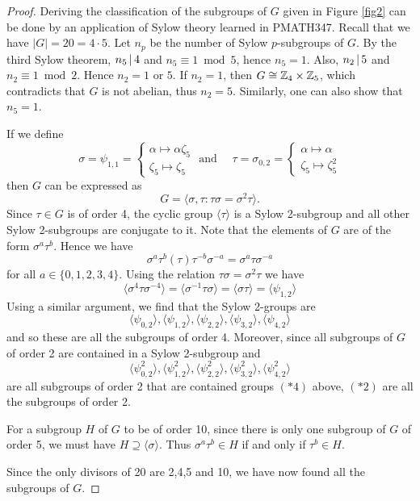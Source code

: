 \documentclass[11pt]{article}
\begin{document}
\begin{proof}
    Deriving the classification of the subgroups of $G$ given in Figure \ref{fig2} can be done by an application of Sylow theory learned in PMATH347. Recall that we have $|G|=20=4\cdot 5$. Let $n_p$ be the number of Sylow $p$-subgroups of $G$. By the third Sylow theorem, $n_5\,|\, 4$ and $n_5\equiv1\bmod{5}$, hence $n_5=1$. Also, $n_2\,|\, 5$ and $n_2\equiv1\bmod{2}$. Hence $n_2=1$ or $5$. If $n_2=1$, then $G\cong\mathbb{Z}_4\times\mathbb{Z}_5$, which contradicts that $G$ is not abelian, thus $n_2=5$. Similarly, one can also show that $n_5=1$. 

     If we define
    \[\sigma=\psi_{1,1}=\begin{cases}\alpha\mapsto\alpha\zeta_5 \\ \zeta_5\mapsto\zeta_5\end{cases}\text{ and }\quad\tau=\sigma_{0,2}=\begin{cases}\alpha\mapsto\alpha \\ \zeta_5\mapsto\zeta_5^2\end{cases}\]
    then $G$ can be expressed as
    \[G=\langle\sigma,\tau:\tau\sigma=\sigma^2\tau\rangle.\]
    Since $\tau\in G$ is of order 4, the cyclic group $\langle\tau\rangle$ is a Sylow 2-subgroup and all other Sylow 2-subgroups are conjugate to it. Note that the elements of $G$ are of the form $\sigma^a\tau^b$. Hence we have
    \[\sigma^a\tau^b(\tau)\tau^{-b}\sigma^{-a}=\sigma^a\tau\sigma^{-a}\]
    for all $a\in\{0,1,2,3,4\}$.
    Using the relation $\tau\sigma=\sigma^2\tau$ we have
    \[\langle\sigma^4\tau\sigma^{-4}\rangle=\langle\sigma^{-1}\tau\sigma\rangle=\langle\sigma\tau\rangle=\langle\psi_{1,2}\rangle\tag{exercise}\]
    Using a similar argument, we find that the Sylow 2-groups are
    \[\langle\psi_{0,2}\rangle,\langle\psi_{1,2}\rangle,\langle\psi_{2,2}\rangle,\langle\psi_{3,2}\rangle,\langle\psi_{4,2}\rangle\tag{$*4$}\]
    and so these are all the subgroups of order 4. Moreover, since all subgroups of $G$ of order 2 are contained in a Sylow 2-subgroup and
    \[\langle\psi_{0,2}^2\rangle,\langle\psi_{1,2}^2\rangle,\langle\psi_{2,2}^2\rangle,\langle\psi_{3,2}^2\rangle,\langle\psi_{4,2}^2\rangle\tag{$*2$}\]
    are all subgroups of order 2 that are contained groups $(*4)$ above, $(*2)$ are all the subgroups of order 2.

    For a subgroup $H$ of $G$ to be of order 10, since there is only one subgroup of $G$ of order 5, we must have $H\supseteq\langle\sigma\rangle$. Thus $\sigma^a\tau^b\in H$ if and only if $\tau^b\in H$.
    
    Since the only divisors of 20 are 2,4,5 and 10, we have now found all the subgroups of $G$.
    
\end{proof}
\end{document}
